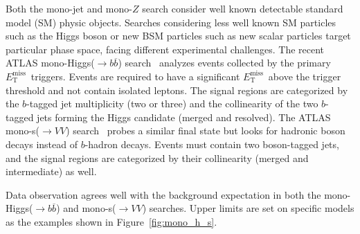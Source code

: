 \documentclass{moriond}
\def\et{E_\mathrm{T}^{\mathrm{miss}}}
\begin{document}
Both the mono-jet and mono-$Z$ search consider well known detectable standard
model (SM) physic objects. Searches considering less well known SM particles
such as the Higgs boson or new BSM particles such as new scalar particles target particular phase space, facing different experimental challenges. The recent
ATLAS mono-Higgs($\rightarrow b\overline{b}$) search~\cite{monoh} analyzes
events collected by the primary $\et$\ triggers. Events are required to have
a significant $\et$\ above the trigger threshold and not contain isolated leptons. The signal regions are categorized by
the $b$-tagged jet multiplicity (two or three) and the collinearity of the two
$b$-tagged jets forming the Higgs candidate (merged and resolved). The ATLAS
mono-s($\rightarrow VV$) search~\cite{monos} probes a similar final state but looks for hadronic boson decays instead of $b$-hadron
decays. Events must contain two boson-tagged jets, and the signal regions are
categorized by their collinearity (merged and intermediate) as well. 

Data observation agrees well with the background expectation in both the mono-Higgs($\rightarrow b\overline{b}$) and mono-s($\rightarrow VV$) searches. Upper limits are set on specific models as the examples shown in Figure~\ref{fig:mono_h_s}.      
\end{document}
